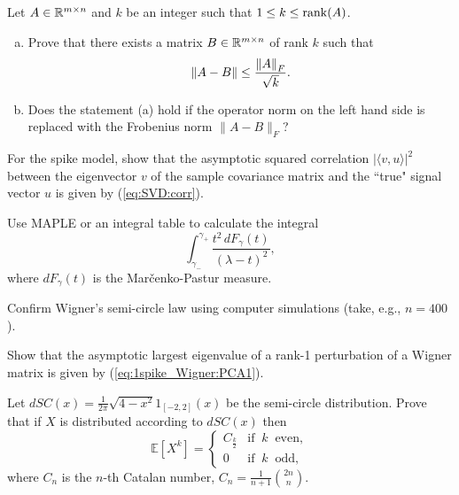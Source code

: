 \begin{myexercise}\label{prob:low_rank_inequality}
    Let $A \in \mathbb{R}^{m \times n}$ and $k$ be an integer such that $1 \leq k \leq \operatorname{rank}(A)$.
    \begin{enumerate}[(a)]
        \item Prove that there exists a matrix $B \in \mathbb{R}^{m \times n}$ of rank $k$ such that
        \begin{equation*}
            {\left\lVert{A-B}\right\rVert} \leq \frac{{\left\lVert{A}\right\rVert}_F}{\sqrt{k}}.
        \end{equation*}
        
        \item Does the statement (a) hold if the operator norm on the left hand side is replaced with the Frobenius norm $\|A - B \|_F$? 
    \end{enumerate}
\end{myexercise}



\begin{myexercise}
For the spike model, show that the asymptotic squared correlation $|\langle v,u \rangle|^2$ between the eigenvector $v$ of the sample covariance matrix and the ``true" signal vector $u$ is given by (\ref{eq:SVD:corr}).
\begin{hint}
    Use MAPLE or an integral table to calculate the integral $$\int_{\gamma_-}^{\gamma_+} \frac{t^2 \,dF_\gamma(t)}{(\lambda-t)^2},$$
    where $dF_\gamma(t)$ is the Mar\v{c}enko-Pastur measure.
\end{hint}

    
\end{myexercise}





\begin{myexercise}
Confirm Wigner's semi-circle law using computer simulations (take, e.g., $n=400$).
\end{myexercise}

\begin{myexercise}
Show that the asymptotic largest eigenvalue of a rank-1 perturbation of a Wigner matrix is given by (\ref{eq:1spike_Wigner:PCA1}).    
\end{myexercise}

\begin{myexercise}
 Let $dSC(x) = \frac1{2\pi}\sqrt{4-x^2}1_{[-2,2]}(x)$ be the semi-circle distribution. Prove that if $X$ is distributed according to $dSC(x)$ then
    $$\mathbb{E}[X^k] = \left\{\begin{array}{cc}
   C_{\frac{k}{2}} & \text{if}\;\; k \;\;\text{even}, \\
0 & \text{if}\;\;k\;\;\text{odd},
  \end{array} \right.$$
where $C_n$ is the $n$-th Catalan number, $C_n = \frac{1}{n+1} {2n \choose n}$.    
\end{myexercise}

